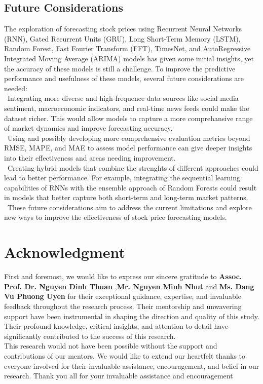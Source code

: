 \documentclass{ieeeojies}
\begin{document}
\subsection{Future Considerations}
The exploration of forecasting stock prices using Recurrent Neural Networks (RNN), Gated Recurrent Units (GRU), Long Short-Term Memory (LSTM), Random Forest, Fast Fourier Transform (FFT), TimesNet, and AutoRegressive Integrated Moving Average (ARIMA) models has given some initial insights, yet the accuracy of these models is still a challenge. To improve the predictive performance and usefulness of these models, several future considerations are needed:
\\\indent\textbullet\
Integrating more diverse and high-frequence data sources like social media sentiment, macroeconomic indicators, and real-time news feeds could make the dataset richer. This would allow models to capture a more comprehansive range of market dynamics and improve forecasting accuracy.
\\\indent\textbullet\
Using and possibly developing more comprehensive evaluation metrics beyond RMSE, MAPE, and MAE to assess model performance can give deeper insights into their effectiveness and areas needing improvement.
\\\indent\textbullet\
Creating hybrid models that combine the strenghts of different approaches could lead to better performance. For example, integrating the sequential learning capabilities of RNNs with the ensemble approach of Random Forests could result in models that better capture both short-term and long-term market patterns.
\\\indent\textbullet\
These future considerations aim to address the current limitations and explore new ways to improve the effectiveness of stock price forecasting models.
\section*{Acknowledgment}
\addcontentsline{toc}{section}{Acknowledgment}
First and foremost, we would like to express our sincere gratitude to \textbf{Assoc. Prof. Dr. Nguyen Dinh Thuan} ,\textbf{Mr. Nguyen Minh Nhut} and \textbf{Ms. Dang Vu Phuong Uyen} for their exceptional guidance, expertise, and invaluable feedback throughout the research process. Their mentorship and unwavering support have been instrumental in shaping the direction and quality of this study. Their profound knowledge, critical insights, and attention to detail have significantly contributed to the success of this research.
\\This research would not have been possible without the support and contributions of our mentors. We would like to extend our heartfelt thanks to everyone involved for their invaluable assistance, encouragement, and belief in our research. Thank you all for your invaluable assistance and encouragement
\end{document}
